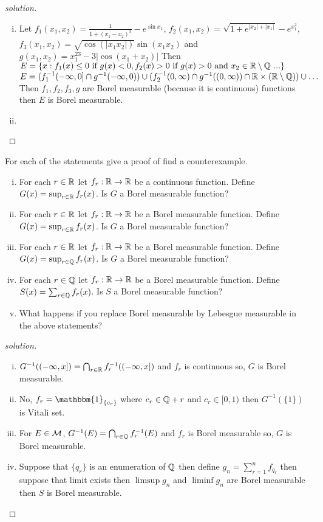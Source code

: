 \begin{proof}[solution]
  \begin{enumerate}[(i)]
    \item Let $f_1(x_1, x_2) = \frac1{1 + (x_1 - x_2)^3} - e^{\sin x_1}$, $f_2(x_1, x_2) = \sqrt{1 + e^{|x_2| + |x_1|}} - e^{x_1^2}$, $f_3(x_1, x_2) = \sqrt{\cos(|x_1x_2|)}\sin(x_1x_2)$ 
    and $g(x_1, x_2) = x_1^{23} - 3|\cos(x_1 + x_2)|$ 
    Then $E = \{x : f_1(x) \le 0 \text{ if } g(x) < 0, f_2(x) > 0 \text{ if } g(x) > 0 \text{ and } x_2 \in \mathbb R \setminus \mathbb Q \text{ ...}\}$
    $E = (f_1^{-1}(-\infty, 0] \cap g^{-1}(-\infty, 0)) \cup (f_2^{-1}(0, \infty) \cap g^{-1}((0, \infty)) \cap \mathbb R \times (\mathbb R \setminus \mathbb Q)) \cup \dots$
    Then $f_1, f_2, f_3, g$ are Borel measurable (because it is continuous) functions then $E$ is Borel measurable.
    \item 
  \end{enumerate}
\end{proof}

\begin{problem}
  For each of the statements give a proof of find a counterexample.
  \begin{enumerate}[(i)]
    \item For each $r \in \mathbb R$ let $f_r : \mathbb R \to \mathbb R$ be a continuous function. Define 
    $G(x) = \sup_{r \in \mathbb R} f_r(x)$. Is $G$ a Borel measurable function?
    \item For each $r \in \mathbb R$ let $f_r : \mathbb R \to \mathbb R$ be a Borel measurable function. 
    Define $G(x) = \sup_{r \in \mathbb R} f_r(x)$. Is $G$ a Borel measurable function?
    \item For each $r \in \mathbb R$ let $f_r : \mathbb R \to \mathbb R$ be a Borel measurable function.
    Define $G(x) = \sup_{r \in \mathbb Q} f_r(x)$. Is $G$ a Borel measurable function?
    \item For each $r \in \mathbb Q$ let $f_r : \mathbb R \to \mathbb R$ be a Borel measurable function.
    Define $S(x) = \sum_{r \in \mathbb Q} f_r(x)$. Is $S$ a Borel measurable function?
    \item What happens if you replace Borel measurable by Lebesgue measurable in the above statements?
  \end{enumerate}
\end{problem}

\begin{proof}[solution]
  \begin{enumerate}[(i)]
    \item $G^{-1}((-\infty, x]) = \bigcap_{r \in \mathbb R} f_r^{-1}((-\infty, x])$ and $f_r$ is continuous so, $G$ is Borel measurable.
    \item No, $f_r = \mathbbm{1}_{\{c_r\}}$ where $c_r \in \mathbb Q + r$ and $c_r \in [0, 1)$ then $G^{-1}(\{1\})$ is Vitali set.
    \item For $E \in \mathcal M$, $G^{-1}(E) = \bigcap_{r \in \mathbb Q} f_r^{-1}(E)$ and $f_r$ is Borel measurable so, $G$ is Borel measurable.
    \item Suppose that $\{q_r\}$ is an enumeration of $\mathbb Q$ then define $g_n = \sum_{r=1}^n f_{q_r}$ then suppose that limit exists then
    $\limsup g_n$ and $\liminf g_n$ are Borel measurable then $S$ is Borel measurable.
  \end{enumerate} 
\end{proof}

